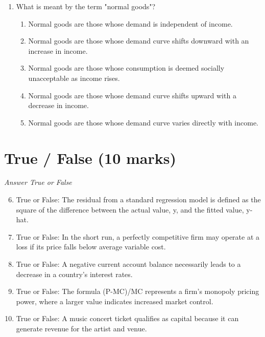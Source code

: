 \documentclass[12pt]{article}
\begin{document}
\begin{enumerate}[label=\arabic*.]
\begin{enumerate}[label=(\alph*)]
    \item 50
    \item 5
    \item 10
    \item 90
    \item 15
\end{enumerate}
\item What is meant by the term "normal goods"?
\begin{enumerate}[label=(\alph*)]
    \item Normal goods are those whose demand is independent of income.
    \item Normal goods are those whose demand curve shifts downward with an increase in income.
    \item Normal goods are those whose consumption is deemed socially unacceptable as income rises.
    \item Normal goods are those whose demand curve shifts upward with a decrease in income.
    \item Normal goods are those whose demand curve varies directly with income.
\end{enumerate}
\end{enumerate}

\section*{True / False (10 marks)}
\textit{Answer True or False}
\begin{enumerate}[label=\arabic*.]
\setcounter{enumi}{5}
\item True or False: The residual from a standard regression model is defined as the square of the difference between the actual value, y, and the fitted value, y-hat.
\item True or False: In the short run, a perfectly competitive firm may operate at a loss if its price falls below average variable cost.
\item True or False: A negative current account balance necessarily leads to a decrease in a country's interest rates.
\item True or False: The formula (P-MC)/MC represents a firm's monopoly pricing power, where a larger value indicates increased market control.
\item True or False: A music concert ticket qualifies as capital because it can generate revenue for the artist and venue.
\end{enumerate}
\end{document}
